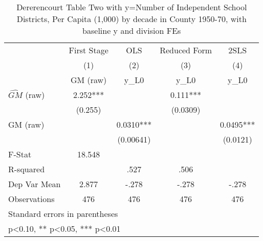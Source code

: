 \begin{table}[htbp]\centering
\def\sym#1{\ifmmode^{#1}\else\(^{#1}\)\fi}
\caption{Dererencourt Table Two with y=Number of Independent School Districts, Per Capita (1,000) by decade in County 1950-70, with baseline y and division FEs}
\begin{tabular}{l*{4}{c}}
\toprule
                    & First Stage   &         OLS   &Reduced Form   &        2SLS   \\
                    &\multicolumn{1}{c}{(1)}&\multicolumn{1}{c}{(2)}&\multicolumn{1}{c}{(3)}&\multicolumn{1}{c}{(4)}\\
                    &\multicolumn{1}{c}{GM  (raw)}&\multicolumn{1}{c}{y\_L0}&\multicolumn{1}{c}{y\_L0}&\multicolumn{1}{c}{y\_L0}\\
\midrule
$\hat{GM}$ (raw)    &       2.252***&               &       0.111***&               \\
                    &     (0.255)   &               &    (0.0309)   &               \\
\addlinespace
GM  (raw)           &               &      0.0310***&               &      0.0495***\\
                    &               &   (0.00641)   &               &    (0.0121)   \\
\midrule
F-Stat              &      18.548   &               &               &               \\
R-squared           &               &        .527   &        .506   &               \\
Dep Var Mean        &       2.877   &       -.278   &       -.278   &       -.278   \\
Observations        &         476   &         476   &         476   &         476   \\
\bottomrule
\multicolumn{5}{l}{\footnotesize Standard errors in parentheses}\\
\multicolumn{5}{l}{\footnotesize * p<0.10, ** p<0.05, *** p<0.01}\\
\end{tabular}
\end{table}

